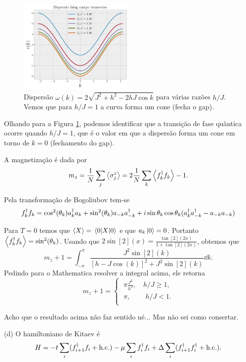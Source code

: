 \documentclass[a4paper,10pt]{article}
\begin{document}
\begin{figure}[H]
\centering
\includegraphics[width=0.5\textwidth]{fig/transv_ising.png}
\caption{Dispersão $\omega(k) = 2\sqrt{J^2 + h^2 - 2hJ \cos k}$ para várias razões $h/J$. Vemos que para $h/J = 1$ a curva forma um cone (fecha o gap).}
\label{fig:transv_ising}
\end{figure}

Olhando para a Figura \ref{fig:transv_ising}, podemos identificar que a transição de fase quântica ocorre quando $h/J = 1$, que é o valor em que a dispersão forma um cone em torno de $k = 0$ (fechamento do gap).

\n

A magnetização é dada por
$$
m_z = \frac{1}{N} \sum_{j} \ev{\s_j^z} = 2 \frac{1}{N}\sum_{k} \ev{f_k^\d f_k} - 1.
$$

Pela transformação de Bogoliubov tem-se
$$
f_k^\dagger f_k = \cos[2](\theta_k) a_k^\dagger a_k + \sin[2](\theta_k) a_{-k}a_{-k}^\dagger
+ i \sin\theta_k \cos\theta_k (a_{k}^\dagger a_{-k}^\dagger - a_{-k} a_{-k})
$$

Para $T = 0$ temos que $\ev{X} = \ev{X}{0}$ e que $a_k \ket{0} = 0$. Portanto $\ev{f_k^\d f_k} = \sin[2](\theta_k)$. Usando que $2 \sin[2](x) = \frac{\tan[2](2x)}{1 + \tan[2](2x)}$, obtemos que
$$
m_z + 1 = \int_{-\pi}^{\pi} \frac{J^2 \sin[2](k)}{[h-J\cos(k)]^2 + J^2\sin[2](k)} \dd{k}.
$$
Pedindo para o Mathematica resolver a integral acima, ele retorna
$$
m_z + 1 =
\begin{cases}
\; \pi \frac{J^2}{h^2} , \quad h/J \geq 1, \\
\; \pi , \quad \quad \, h/J < 1. \\
\end{cases}
$$

Acho que o resultado acima não faz sentido né... Mas não sei como consertar.

\n

(d) O hamiltoniano de Kitaev é
$$
H = -t \sum_{i} (f_{i+1}^\dagger f_i + \text{h.c.}) - \mu \sum_{i} f_i^\dagger f_i
+ \Delta \sum_{i} (f_{i+1}^\dagger f_i^\dagger + \text{h.c.}).
$$
\end{document}

